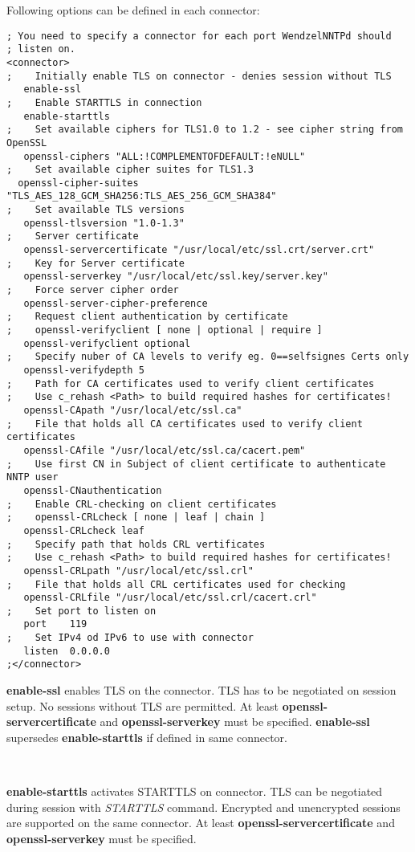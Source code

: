 Following options can be defined in each connector:
\begin{verbatim}
; You need to specify a connector for each port WendzelNNTPd should
; listen on.
<connector>
;    Initially enable TLS on connector - denies session without TLS
   enable-ssl
;    Enable STARTTLS in connection
   enable-starttls
;    Set available ciphers for TLS1.0 to 1.2 - see cipher string from OpenSSL
   openssl-ciphers "ALL:!COMPLEMENTOFDEFAULT:!eNULL"
;    Set available cipher suites for TLS1.3
  openssl-cipher-suites "TLS_AES_128_GCM_SHA256:TLS_AES_256_GCM_SHA384"
;    Set available TLS versions
   openssl-tlsversion "1.0-1.3"
;    Server certificate
   openssl-servercertificate "/usr/local/etc/ssl.crt/server.crt"
;    Key for Server certificate
   openssl-serverkey "/usr/local/etc/ssl.key/server.key"
;    Force server cipher order
   openssl-server-cipher-preference
;    Request client authentication by certificate
;    openssl-verifyclient [ none | optional | require ]
   openssl-verifyclient optional
;    Specify nuber of CA levels to verify eg. 0==selfsignes Certs only
   openssl-verifydepth 5
;    Path for CA certificates used to verify client certificates
;    Use c_rehash <Path> to build required hashes for certificates!
   openssl-CApath "/usr/local/etc/ssl.ca"
;    File that holds all CA certificates used to verify client certificates
   openssl-CAfile "/usr/local/etc/ssl.ca/cacert.pem"
;    Use first CN in Subject of client certificate to authenticate NNTP user
   openssl-CNauthentication
;    Enable CRL-checking on client certificates
;    openssl-CRLcheck [ none | leaf | chain ]
   openssl-CRLcheck leaf
;    Specify path that holds CRL vertificates
;    Use c_rehash <Path> to build required hashes for certificates!
   openssl-CRLpath "/usr/local/etc/ssl.crl"
;    File that holds all CRL certificates used for checking
   openssl-CRLfile "/usr/local/etc/ssl.crl/cacert.crl"
;    Set port to listen on
   port    119
;    Set IPv4 od IPv6 to use with connector
   listen  0.0.0.0
;</connector>
\end{verbatim}

\textbf{enable-ssl} enables TLS on the connector.
TLS has to be negotiated on session setup.
No sessions without TLS are permitted.
At least \textbf{openssl-servercertificate} and \textbf{openssl-serverkey} must be specified.
\textbf{enable-ssl} supersedes \textbf{enable-starttls} if defined in same connector.

~

\textbf{enable-starttls} activates STARTTLS on connector.
TLS can be negotiated during session with \textit{STARTTLS} command. 
Encrypted and unencrypted sessions are supported on the same connector.
At least \textbf{openssl-servercertificate} and \textbf{openssl-serverkey} must be specified.

